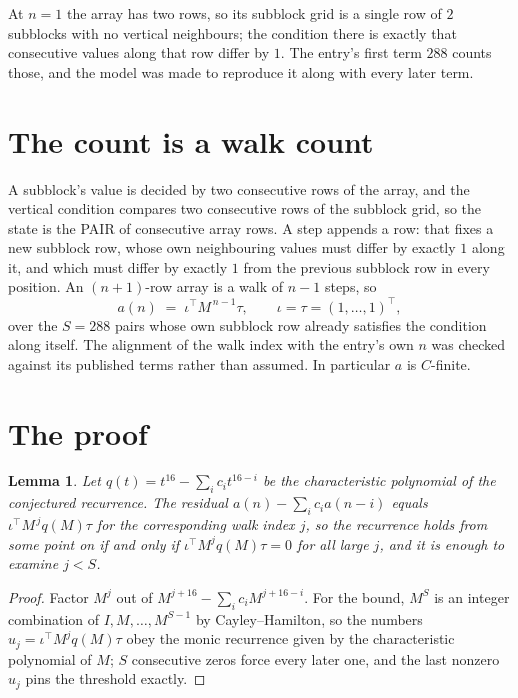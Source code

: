 \documentclass[11pt,a4paper]{article}
\theoremstyle{plain}
\newtheorem{lemma}[theorem]{Lemma}
\theoremstyle{definition}
\begin{document}
At $n=1$ the array has two rows, so its subblock grid is a single row of $2$ subblocks with
no vertical neighbours; the condition there is exactly that consecutive values along that row
differ by $1$. The entry's first term $288$ counts those, and the model was made to
reproduce it along with every later term.

\section{The count is a walk count}

A subblock's value is decided by two consecutive rows of the array, and the
vertical condition compares two consecutive rows of the subblock grid, so the state is the
PAIR of consecutive array rows. A step appends a row: that fixes a new subblock row, whose own
neighbouring values must differ by exactly $1$ along it, and which must differ by exactly
$1$ from the previous subblock row in every position. An $(n+1)$-row array is a walk of
$n-1$ steps, so
\[
a(n)\;=\;\iota^{\!\top}M^{\,n-1}\tau,\qquad\iota=\tau=(1,\dots,1)^{\!\top},
\]
over the $S=288$ pairs whose own subblock row already satisfies the condition along itself.
The alignment of the walk index with the entry's own $n$ was checked against its published
terms rather than assumed. In particular $a$ is $C$-finite.

\section{The proof}

\begin{lemma}\label{lem:crit}
Let $q(t)=t^{16}-\sum_i c_it^{16-i}$ be the characteristic polynomial of the
conjectured recurrence. The residual $a(n)-\sum_ic_ia(n-i)$ equals
$\iota^{\!\top}M^{\,j}q(M)\tau$ for the corresponding walk index $j$, so the recurrence
holds from some point on if and only if $\iota^{\!\top}M^{j}q(M)\tau=0$ for all large $j$,
and it is enough to examine $j<S$.
\end{lemma}

\begin{proof}
Factor $M^{j}$ out of $M^{j+16}-\sum_ic_iM^{j+16-i}$. For the bound, $M^{S}$
is an integer combination of $I,M,\dots,M^{S-1}$ by Cayley--Hamilton, so the numbers
$u_j=\iota^{\!\top}M^{j}q(M)\tau$ obey the monic recurrence given by the characteristic
polynomial of $M$; $S$ consecutive zeros force every later one, and the last nonzero $u_j$
pins the threshold exactly.
\end{proof}
\end{document}
